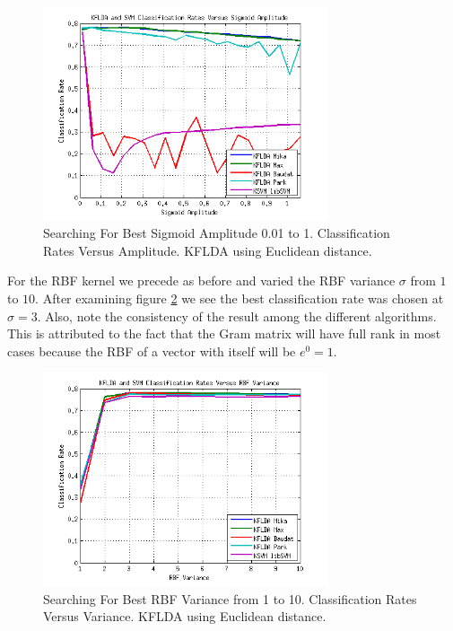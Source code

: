 \documentclass[journal]{IEEEtran}
\begin{document}
\begin{figure}[!h]
\centering
\includegraphics[width=3.3in]{../images/sig_kernel_optimize_2.png}
\caption{Searching For Best Sigmoid Amplitude 0.01 to 1. Classification Rates Versus Amplitude. KFLDA using Euclidean distance.}
\label{fig:sig_kernel_eu}
\end{figure}

\par For the RBF kernel we precede as before and varied the RBF variance \(\sigma\) from \(1\) to \(10\). After examining figure \ref{fig:rbf_kernel_eu} we see the best classification rate was chosen at \(\sigma=3\). Also, note the consistency of the result among the different algorithms. This is attributed to the fact that the Gram matrix will have full rank in most cases because the RBF of a vector with itself will be \(e^0 = 1\).

\begin{figure}[!h]
\centering
\includegraphics[width=3.3in]{../images/rbf_kernel_optimize_2.png}
\caption{Searching For Best RBF Variance from 1 to 10. Classification Rates Versus Variance. KFLDA using Euclidean distance.}
\label{fig:rbf_kernel_eu}
\end{figure}
\end{document}
